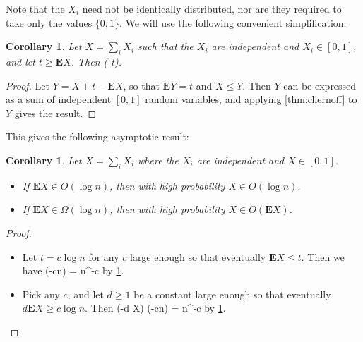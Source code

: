 \documentclass[11pt,a4paper]{article}
\newtheorem{corollary}[theorem]{Corollary}
\newcommand*{\E}[0]{\mathbf{E}}
\def\[#1\]{\begin{align*}#1\end{align*}}
\begin{document}
Note that the \(X_i\) need not be identically distributed, nor are they required to take only the values \(\{0, 1\}\).
We will use the following convenient simplification:

\begin{tcolorbox}
  \begin{corollary}
    \label{cor:chernoff-simple}
    Let \(X = \sum_i X_i\) such that the \(X_i\) are independent and $X_i \in [0, 1]$,
    and let \(t \ge \E X\).
    Then \[\Pr[X \ge 3t] \le \exp(-t).\]  
  \end{corollary}
\end{tcolorbox}
\begin{proof}
  Let \(Y = X + t - \E X\), so that $\E Y = t$ and $X \le Y$.
  Then \(Y\) can be expressed as a sum of independent $[0, 1]$ random variables,
  and applying \cref{thm:chernoff} to \(Y\) gives the result.
\end{proof}

This gives the following asymptotic result:

\begin{tcolorbox}
  \begin{corollary}
    Let \(X = \sum_i X_i\) where the \(X_i\) are independent and \(X \in [0, 1]\).
    \begin{itemize}
    \item If \(\E X \in O(\log n)\), then with high probability \(X \in O(\log n)\).
    \item If \(\E X \in \Omega(\log n)\), then with high probability \(X \in O(\E X)\).
    \end{itemize}
  \end{corollary}
\end{tcolorbox}
\begin{proof}\hfill
  \begin{itemize}
  \item
    Let \(t = c \log n\) for any \(c\) large enough so that eventually \(\E X \le t\).
    Then we have
    \[\Pr[X \ge 3c \log n] \le \exp(-c\log n) = n^{-c}\]
    by \cref{cor:chernoff-simple}.
  \item
    Pick any \(c\),
    and let \(d \ge 1\) be a constant large enough so that eventually \(d\E X \ge c \log n\).
    Then \[\Pr[X \ge 3d \E X] \le \exp(-d \E X) \le \exp(-c\log n) = n^{-c}\]
    by \cref{cor:chernoff-simple}.
  \end{itemize}
\end{proof}

\end{document}
